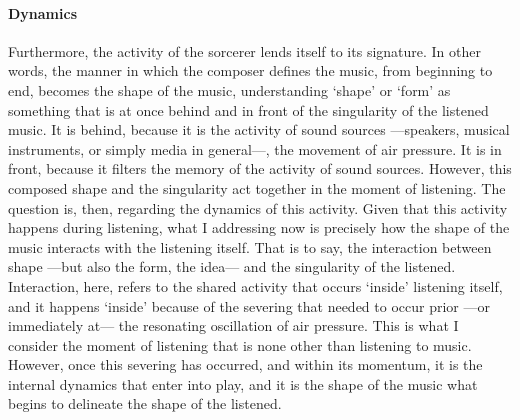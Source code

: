 \paragraph{Dynamics}
Furthermore, the activity of the sorcerer lends itself to its signature. In other words, the manner in which the composer defines the music, from beginning to end, becomes the shape of the music, understanding `shape' or `form' as something that is at once behind and in front of the singularity of the listened music. It is behind, because it is the activity of sound sources ---speakers, musical instruments, or simply media in general---, the movement of air pressure. It is in front, because it filters the memory of the activity of sound sources. However, this composed shape and the singularity act together in the moment of listening. The question is, then, regarding the dynamics of this activity. Given that this activity happens during listening, what I addressing now is precisely how the shape of the music interacts with the listening itself. That is to say, the interaction between shape ---but also the form, the idea--- and the singularity of the listened. Interaction, here, refers to the shared activity that occurs `inside' listening itself, and it happens `inside' because of the severing that needed to occur prior ---or immediately at--- the resonating oscillation of air pressure. This is what I consider the moment of listening that is none other than listening to music. However, once this severing has occurred, and within its momentum, it is the internal dynamics that enter into play, and it is the shape of the music what begins to delineate the shape of the listened.

